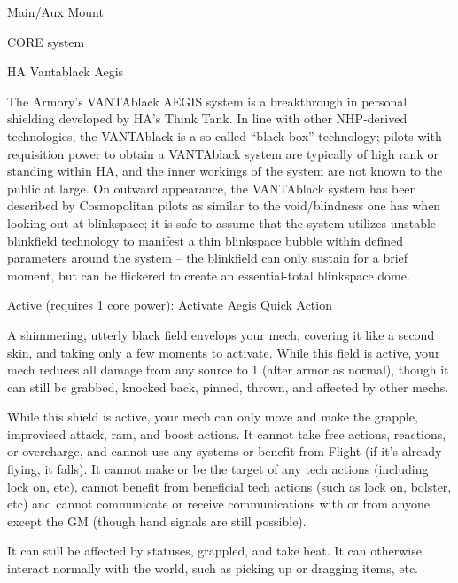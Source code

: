  Main/Aux Mount 

                                               CORE system 

                                                                                                          


                                                HA Vantablack Aegis  

 The Armory’s VANTAblack AEGIS system is a breakthrough in personal shielding developed by HA’s  
 Think Tank. In line with other NHP-derived technologies, the VANTAblack is a so-called “black-box”  
 technology; pilots with requisition power to obtain a VANTAblack system are typically of high rank or  
 standing within HA, and the inner workings of the system are not known to the public at large. On  
 outward appearance, the VANTAblack system has been described by Cosmopolitan pilots as similar to  
 the void/blindness one has when looking out at blinkspace; it is safe to assume that the system utilizes  
 unstable blinkfield technology to manifest a thin blinkspace bubble within defined parameters around  
 the system -- the blinkfield can only sustain for a brief moment, but can be flickered to create an  
 essential-total blinkspace dome.       

 Active (requires 1 core power): Activate Aegis  
 Quick Action
 
 A shimmering, utterly black field envelops your mech, covering it like a second skin, and taking only a  
 few moments to activate. While this field is active, your mech reduces all damage from any source to 1  
 (after armor as normal), though it can still be grabbed, knocked back, pinned, thrown, and affected by  
 other mechs.
 

 While this shield is active, your mech can only move and make the grapple, improvised attack, ram,  
 and boost actions. It cannot take free actions, reactions, or overcharge, and cannot use any systems or  
 benefit from Flight (if it’s already flying, it falls). It cannot make or be the target of any tech actions  
 (including lock on, etc), cannot benefit from beneficial tech actions (such as lock on, bolster, etc) and  
 cannot communicate or receive communications with or from anyone except the GM (though hand  
 signals are still possible). 
 

  It can still be affected by statuses, grappled, and take heat. It can otherwise interact normally with the  
 world, such as picking up or dragging items, etc.
 

